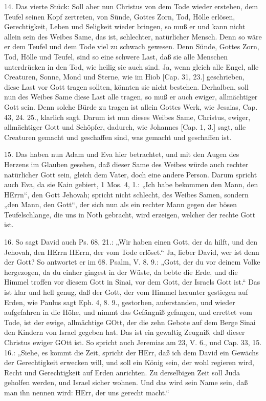 14. Das vierte Stück: Soll aber nun Christus von dem Tode wieder erstehen, dem Teufel seinen Kopf zertreten, von Sünde, Gottes Zorn, Tod, Hölle erlösen, Gerechtigkeit, Leben und Seligkeit wieder bringen, so muß er und kann nicht allein sein des Weibes Same, das ist, schlechter, natürlicher Mensch. Denn so wäre er dem Teufel und dem Tode viel zu schwach gewesen. Denn Sünde, Gottes Zorn, Tod, Hölle und Teufel, sind so eine schwere Last, daß sie alle Menschen unterdrücken in den Tod, wie heilig sie auch sind. Ja, wenn gleich alle Engel, alle Creaturen, Sonne, Mond und Sterne, wie im Hiob [Cap. 31, 23.] geschrieben, diese Last vor Gott tragen sollten, könnten sie nicht bestehen. Derhalben, soll nun des Weibes Same diese Last alle tragen, so muß er auch ewiger, allmächtiger Gott sein. Denn solche Bürde zu tragen ist allein Gottes Werk, wie Jesaias, Cap. 43, 24. 25., klarlich sagt. Darum ist nun dieses Weibes Same, Christus, ewiger, allmächtiger Gott und Schöpfer, dadurch, wie Johannes [Cap. 1, 3.] sagt, alle Creaturen gemacht und geschaffen sind, was gemacht und geschaffen ist.

15. Das haben nun Adam und Eva hier betrachtet, und mit den Augen des Herzens im Glauben gesehen, daß dieser Same des Weibes würde auch rechter natürlicher Gott sein, gleich dem Vater, doch eine andere Person. Darum spricht auch Eva, da sie Kain gebiert, 1 Mos. 4, 1.: „Ich habe bekommen den Mann, den HErrn“, den Gott Jehovah; spricht nicht schlecht, des Weibes Samen, sondern „den Mann, den Gott“, der sich nun als ein rechter Mann gegen der bösen Teufelschlange, die uns in Noth gebracht, wird erzeigen, welcher der rechte Gott ist.

16. So sagt David auch Ps. 68, 21.: „Wir haben einen Gott, der da hilft, und den Jehovah, den HErrn HErrn, der vom Tode erlöset.“ Ja, lieber David, wer ist denn der Gott? So antwortet er im 68. Psalm, V. 8. 9.: „Gott, der du vor deinem Volke hergezogen, da du einher gingest in der Wüste, da bebte die Erde, und die Himmel troffen vor diesem Gott in Sinai, vor dem Gott, der Israels Gott ist.“ Das ist klar und hell genug, daß der Gott, der vom Himmel herunter gestiegen auf Erden, wie Paulus sagt Eph. 4, 8. 9., gestorben, auferstanden, und wieder
aufgefahren in die Höhe, und nimmt das Gefängniß gefangen, und errettet vom Tode, ist der ewige, allmächtige GOtt, der die zehn Gebote auf dem Berge Sinai den Kindern von Israel gegeben hat. Das ist ein gewaltig Zeugniß, daß dieser Christus ewiger GOtt ist. So spricht auch Jeremias am 23, V. 6., und Cap. 33, 15. 16.: „Siehe, es kommt die Zeit, spricht der HErr, daß ich dem David ein Gewächs der Gerechtigkeit erwecken will, und soll ein König sein, der wohl regieren wird, Recht und Gerechtigkeit auf Erden anrichten. Zu derselbigen Zeit soll Juda geholfen werden, und Israel sicher wohnen. Und das wird sein Name sein, daß man ihn nennen wird: HErr, der uns gerecht macht.“

